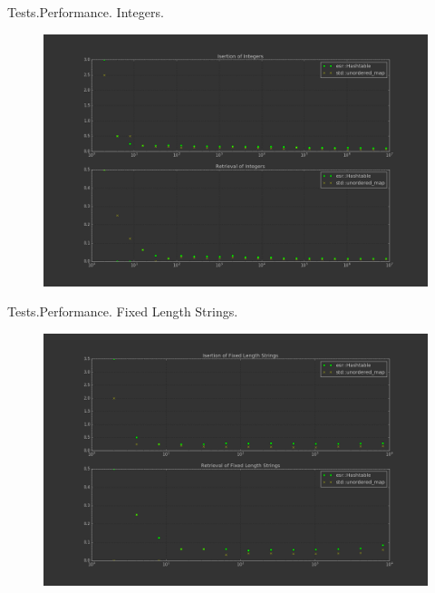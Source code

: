 \documentclass{beamer}
\begin{document}
\begin{frame}{Tests.}{Performance. Integers.}
  \begin{figure}
    \includegraphics[scale=0.3]{pictures/int_perf}
  \end{figure}
\end{frame}

\begin{frame}{Tests.}{Performance. Fixed Length Strings.}
  \begin{figure}
    \includegraphics[scale=0.3]{pictures/fstr_perf}
  \end{figure}
\end{frame}
\end{document}
